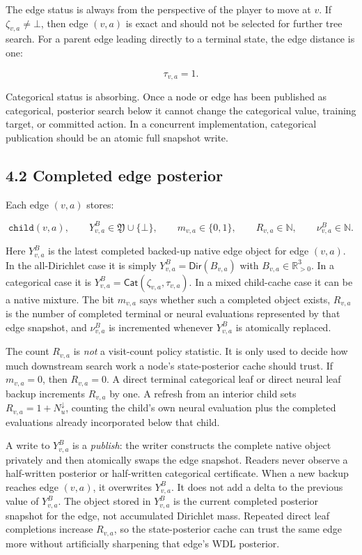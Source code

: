 \documentclass[11pt]{article}
\newcommand{\R}{\mathbb{R}}
\newcommand{\Native}{\mathfrak{Y}}
\newcommand{\DirObj}{\mathsf{Dir}}
\newcommand{\CatObj}{\mathsf{Cat}}
\begin{document}
The edge status is always from the perspective of the player to move at \(v\).
If \(\zeta_{v,a}\ne\bot\), then edge \((v,a)\) is exact and should not be
selected for further tree search. For a parent edge leading directly to a
terminal state, the edge distance is one:

\[
\tau_{v,a}=1.
\]

Categorical status is absorbing. Once a node or edge has been published as
categorical, posterior search below it cannot change the categorical value,
training target, or committed action. In a concurrent implementation,
categorical publication should be an atomic full snapshot write.

\subsection*{4.2 Completed edge posterior}

Each edge \((v,a)\) stores:

\[
\texttt{child}(v,a),
\qquad
Y^B_{v,a}\in\Native\cup\{\bot\},
\qquad
m_{v,a}\in\{0,1\},
\qquad
R_{v,a}\in\mathbb{N},
\qquad
\nu^B_{v,a}\in\mathbb{N}.
\]

Here \(Y^B_{v,a}\) is the latest completed backed-up native edge object for edge
\((v,a)\). In the all-Dirichlet case it is simply
\(Y^B_{v,a}=\DirObj(B_{v,a})\) with \(B_{v,a}\in\R_{>0}^3\). In a categorical
case it is \(Y^B_{v,a}=\CatObj(\zeta_{v,a},\tau_{v,a})\). In a mixed child-cache
case it can be a native mixture. The bit \(m_{v,a}\) says whether such a
completed object exists, \(R_{v,a}\) is the number of completed terminal or
neural evaluations represented by that edge snapshot, and \(\nu^B_{v,a}\) is
incremented whenever \(Y^B_{v,a}\) is atomically replaced.

The count \(R_{v,a}\) is \emph{not} a visit-count policy statistic. It is only
used to decide how much downstream search work a node's state-posterior cache
should trust. If \(m_{v,a}=0\), then \(R_{v,a}=0\). A direct terminal categorical
leaf or direct neural leaf backup increments \(R_{v,a}\) by one. A refresh from
an interior child sets \(R_{v,a}=1+N^\downarrow_u\), counting the child's own
neural evaluation plus the completed evaluations already incorporated below that
child.

A write to \(Y^B_{v,a}\) is a \emph{publish}: the writer constructs the complete
native object privately and then atomically swaps the edge snapshot. Readers
never observe a half-written posterior or half-written categorical certificate.
When a new backup reaches edge \((v,a)\), it overwrites \(Y^B_{v,a}\). It does
not add a delta to the previous value of \(Y^B_{v,a}\). The object stored in
\(Y^B_{v,a}\) is the current completed posterior snapshot for the edge, not
accumulated Dirichlet mass. Repeated direct leaf completions increase
\(R_{v,a}\), so the state-posterior cache can trust the same edge more without
artificially sharpening that edge's WDL posterior.
\end{document}
